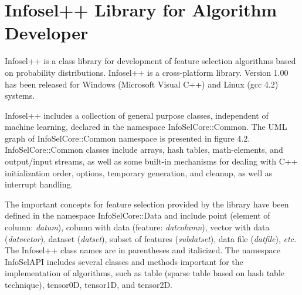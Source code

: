 \documentclass[a4paper,fleqn]{report}
\def\etc{{\em etc.}}
\begin{document}
%


\chapter{Infosel++ Library for Algorithm Developer} \label{sec:InfoselAlgDev}

Infosel++ is a class library for development of feature selection algorithms based on probability distributions. 
Infosel++ is a cross-platform library. Version 1.00 has been released for Windows (Microsoft Visual C++) and 
Linux (gcc 4.2) systems. 

Infosel++ includes a collection of general purpose classes, independent of machine learning, declared in the namespace 
InfoSelCore::Common. The UML graph of InfoSelCore::Common namespace is presented in figure 4.2. %
InfoSelCore::Common classes include arrays, hash tables, math-elements, and output/input streams, 
as well as some built-in mechanisms for dealing with C++ initialization order, options, temporary generation,
and cleanup, as well as interrupt handling.

The important concepts for feature selection provided by the library have been defined in the namespace InfoSelCore::Data 
and include point (element of column: {\it datum}), column with data (feature: {\it datcolumn}), vector with data
({\it datvector}), dataset ({\it datset}), subset of features ({\it subdatset}), data file ({\it datfile}), \etc 
The Infosel++ class names are in parentheses and italicized. %
The namespace InfoSelAPI includes several classes and methods important for the implementation of algorithms,
such as table (sparse table based on hash table technique), tensor0D, tensor1D, and tensor2D. 
\end{document}
